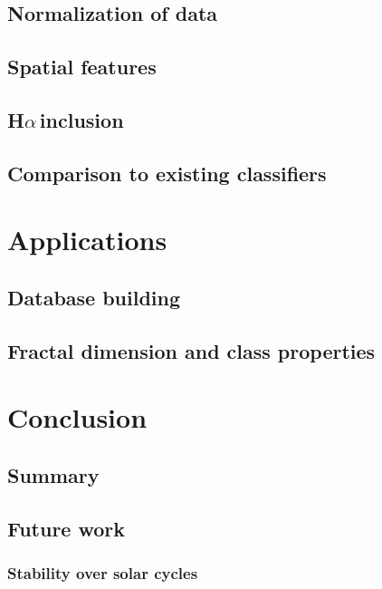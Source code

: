 \documentclass[twoside]{report}
\newcommand{\halpha}{H$\alpha$\,}
\begin{document}
\section{Normalization of data}

\section{Spatial features}

\section{\halpha inclusion}\label{sec:halphainclusion}

\section{Comparison to existing classifiers}

\chapter{Applications} \label{ch:application}

\section{Database building} \label{sec:database}

\section{Fractal dimension and class properties} \label{sec:fractal}

\chapter{Conclusion} \label{ch:conclusion}

\section{Summary}

\section{Future work}

\subsection{Stability over solar cycles}



\end{document}
